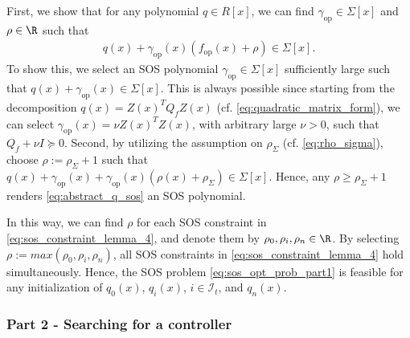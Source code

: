 \begin{IEEEproof}
   First, we show that for any polynomial $q \in R[x]$, we can find $\gamma_{\text{op}} \in \Sigma[x]$ and $\rho \in \R$ such that
   \begin{align} \label{eq:abstract_q_sos}
      q(x) + \gamma_{\text{op}}(x) (f_\text{op}(x) + \rho ) \in \Sigma[x].
   \end{align}
   To show this, we select an SOS polynomial $\gamma_{\text{op}} \in \Sigma[x]$ sufficiently large such that $q(x) + \gamma_{\text{op}}(x) \in \Sigma[x]$.
   This is always possible since starting from the decomposition $q(x) = Z(x)^T Q_f Z(x)$ (cf. \cref{eq:quadratic_matrix_form}), we can select $\gamma_{\text{op}}(x) = \nu Z(x)^T Z(x)$, with arbitrary large $\nu > 0$, such that $Q_f + \nu I \succcurlyeq 0$.
   Second, by utilizing the assumption on $\rho_\Sigma$ (cf. \cref{eq:rho_sigma}), choose $\rho := \rho_\Sigma + 1$ such that
   $q(x) + \gamma_{\text{op}}(x) + \gamma_{\text{op}}(x) (\rho(x) + \rho_\Sigma ) \in \Sigma[x]$.
   Hence, any $\rho \geq \rho_\Sigma + 1$ renders \cref{eq:abstract_q_sos} an SOS polynomial.
   
   In this way, we can find $\rho$ for each SOS constraint in \cref{eq:sos_constraint_lemma_4}, and denote them by $\rho_0, \rho_i, \rho_n \in \R$.
   By selecting $\rho := max(\rho_0, \rho_i, \rho_n)$, all SOS constraints in \cref{eq:sos_constraint_lemma_4} hold simultaneously.
   Hence, the SOS problem \cref{eq:sos_opt_prob_part1} is feasible for any initialization of $q_0(x)$, $q_i(x)$, $i \in \mathcal I_t$, and $q_n(x)$.
\end{IEEEproof}



\subsubsection*{Part 2 - Searching for a controller}


